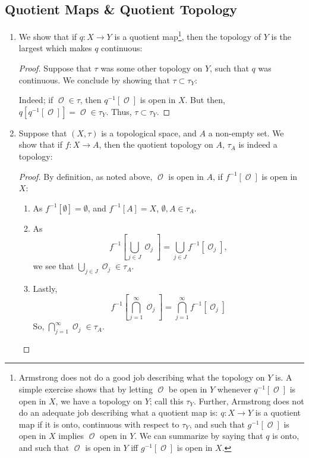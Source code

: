 \documentclass{book}
\DeclareMathOperator*{\Ocal}{\mathcal{O}}
\begin{document}
\subsection{Quotient Maps \& Quotient Topology}
\begin{enumerate}[(1)]
    \item We show that if $q: X \rightarrow Y$ is a quotient map\footnote{Armstrong does not do a good job describing what the topology on $Y$ is. A simple exercise shows that by letting ${\Ocal}$ be open in $Y$ whenever $q^{-1}[{\Ocal}]$ is open in $X$, we have a topology on $Y$; call this $\tau_{Y}$. Further, Armstrong does not do an adequate job describing what a quotient map is: $q: X \rightarrow Y$ is a quotient map if it is onto, continuous with respect to $\tau_Y$, and such that $g^{-1}[{\Ocal}]$ is open in $X$ implies ${\Ocal}$ open in $Y$. We can summarize by saying that $q$ is onto, and such that ${\Ocal}$ is open in $Y$ iff $g^{-1}[{\Ocal}]$ is open in $X$.}, then the topology of $Y$ is the largest which makes $q$ continuous: 
        \begin{proof} Suppose that $\tau$ was some other topology on $Y$, such that $q$ was continuous. We conclude by showing that $\tau \subset \tau_Y$:
            \par Indeed; if ${\Ocal} \in \tau$, then $q^{-1}[{\Ocal}]$ is open in $X$. But then, $q[q^{-1}[{\Ocal}]] = {\Ocal} \in \tau_Y$. Thus, $\tau \subset \tau_Y$. 
        \end{proof}

    \item Suppose that $(X, \tau)$ is a topological space, and $A$ a non-empty set. We show that if $f: X \rightarrow A$, then the quotient topology on $A$, $\tau_A$ is indeed a topology: 
        \begin{proof} By definition, as noted above, ${\Ocal}$ is open in $A$, if $f^{-1}[{\Ocal}]$ is open in $X$:
            \begin{enumerate}
                \item As $f^{-1}[\emptyset] = \emptyset$, and $f^{-1}[A] = X$, $\emptyset, A \in \tau_A$.
                \item As $$f^{-1}[\bigcup_{j \in J} {\Ocal}_j] = \bigcup_{j \in J} f^{-1}[{\Ocal}_j],$$ we see that $\bigcup_{j \in J} {\Ocal}_j \in \tau_A$.
                \item Lastly, $$f^{-1}[\bigcap_{j =1 }^\infty {\Ocal}_j] = \bigcap_{j =1}^\infty f^{-1}[{\Ocal}_j]$$ So, $\bigcap_{j =1 }^\infty {\Ocal}_j \in \tau_A$. 
            \end{enumerate}
        \end{proof}


\end{enumerate}
\end{document}
